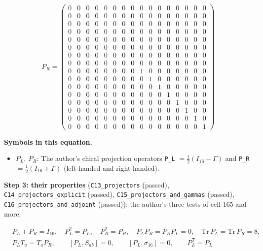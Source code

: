 \documentclass[
  10pt,
]{article}
\providecommand{\tightlist}{%
  \setlength{\itemsep}{0pt}\setlength{\parskip}{0pt}}
\begin{document}
\[
P_R = \scriptstyle \begin{pmatrix} 0 & 0 & 0 & 0 & 0 & 0 & 0 & 0 & 0 & 0 & 0 & 0 & 0 & 0 & 0 & 0 \\ 0 & 0 & 0 & 0 & 0 & 0 & 0 & 0 & 0 & 0 & 0 & 0 & 0 & 0 & 0 & 0 \\ 0 & 0 & 0 & 0 & 0 & 0 & 0 & 0 & 0 & 0 & 0 & 0 & 0 & 0 & 0 & 0 \\ 0 & 0 & 0 & 0 & 0 & 0 & 0 & 0 & 0 & 0 & 0 & 0 & 0 & 0 & 0 & 0 \\ 0 & 0 & 0 & 0 & 0 & 0 & 0 & 0 & 0 & 0 & 0 & 0 & 0 & 0 & 0 & 0 \\ 0 & 0 & 0 & 0 & 0 & 0 & 0 & 0 & 0 & 0 & 0 & 0 & 0 & 0 & 0 & 0 \\ 0 & 0 & 0 & 0 & 0 & 0 & 0 & 0 & 0 & 0 & 0 & 0 & 0 & 0 & 0 & 0 \\ 0 & 0 & 0 & 0 & 0 & 0 & 0 & 0 & 0 & 0 & 0 & 0 & 0 & 0 & 0 & 0 \\ 0 & 0 & 0 & 0 & 0 & 0 & 0 & 0 & 1 & 0 & 0 & 0 & 0 & 0 & 0 & 0 \\ 0 & 0 & 0 & 0 & 0 & 0 & 0 & 0 & 0 & 1 & 0 & 0 & 0 & 0 & 0 & 0 \\ 0 & 0 & 0 & 0 & 0 & 0 & 0 & 0 & 0 & 0 & 1 & 0 & 0 & 0 & 0 & 0 \\ 0 & 0 & 0 & 0 & 0 & 0 & 0 & 0 & 0 & 0 & 0 & 1 & 0 & 0 & 0 & 0 \\ 0 & 0 & 0 & 0 & 0 & 0 & 0 & 0 & 0 & 0 & 0 & 0 & 1 & 0 & 0 & 0 \\ 0 & 0 & 0 & 0 & 0 & 0 & 0 & 0 & 0 & 0 & 0 & 0 & 0 & 1 & 0 & 0 \\ 0 & 0 & 0 & 0 & 0 & 0 & 0 & 0 & 0 & 0 & 0 & 0 & 0 & 0 & 1 & 0 \\ 0 & 0 & 0 & 0 & 0 & 0 & 0 & 0 & 0 & 0 & 0 & 0 & 0 & 0 & 0 & 1 \end{pmatrix}
\]

\textbf{Symbols in this equation.}

\begin{itemize}
\tightlist
\item
  \(P_L,\ P_R\): The author's chiral projection operators \texttt{P\_L}
  \(= \tfrac12(I_{16} - \Gamma)\) and \texttt{P\_R}
  \(= \tfrac12(I_{16} + \Gamma)\) (left-handed and right-handed).
\end{itemize}

\textbf{Step 3: their properties} (\texttt{C13\_projectors} (passed),
\texttt{C14\_projectors\_explicit} (passed),
\texttt{C15\_projectors\_and\_gammas} (passed),
\texttt{C16\_projectors\_and\_adjoint} (passed)): the author's three
tests of cell 165 and more,

\[
\begin{aligned}
&P_L + P_R = I_{16},\quad P_L^2 = P_L,\quad P_R^2 = P_R,\quad P_LP_R = P_RP_L = 0,\quad \mathrm{Tr}\,P_L = \mathrm{Tr}\,P_R = 8,\\
&P_LT_a = T_aP_R,\qquad [P_L, S_{ab}] = 0,\qquad [P_L, \sigma_{16}] = 0,\qquad P_L^{\mathsf T} = P_L
\end{aligned}
\]
\end{document}
